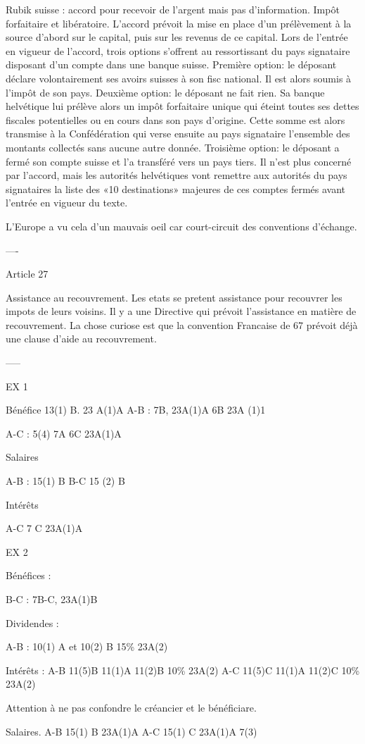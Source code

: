 \documentclass{book}
\begin{document}
Rubik suisse : accord pour recevoir de l'argent mais pas d'information. Impôt forfaitaire et libératoire. L'accord prévoit la mise en place d'un prélèvement à la source d'abord sur le capital, puis sur les revenus de ce capital. Lors de l'entrée en vigueur de l'accord, trois options s'offrent au ressortissant du pays signataire disposant d'un compte dans une banque suisse. Première option: le déposant déclare volontairement ses avoirs suisses à son fisc national. Il est alors soumis à l'impôt de son pays. Deuxième option: le déposant ne fait rien. Sa banque helvétique lui prélève alors un impôt forfaitaire unique qui éteint toutes ses dettes fiscales potentielles ou en cours dans son pays d'origine. Cette somme est alors transmise à la Confédération qui verse ensuite au pays signataire l'ensemble des montants collectés sans aucune autre donnée. Troisième option: le déposant a fermé son compte suisse et l'a transféré vers un pays tiers. Il n'est plus concerné par l'accord, mais les autorités helvétiques vont remettre aux autorités du pays signataires la liste des «10 destinations» majeures de ces comptes fermés avant l'entrée en vigueur du texte.

L'Europe a vu cela d'un mauvais oeil car court-circuit des conventions d'échange.

----

Article 27

Assistance au recouvrement. Les etats se pretent assistance pour recouvrer les impots de leurs voisins. Il y a une Directive qui prévoit l'assistance en matière de recouvrement. La chose curiose est que la convention Francaise de 67 prévoit déjà une clause d'aide au recouvrement.

-----

EX 1


Bénéfice 13(1) B. 23 A(1)A
A-B : 7B, 23A(1)A
6B 23A (1)1

A-C : 5(4) 7A
6C 23A(1)A

Salaires

A-B : 15(1) B
B-C 15 (2) B

Intérêts 

A-C 7 C 23A(1)A


EX 2

Bénéfices :

B-C : 7B-C, 23A(1)B

Dividendes :

A-B : 10(1) A et 10(2) B 15\% 23A(2)

Intérêts : 
A-B 11(5)B 11(1)A 11(2)B 10\% 23A(2)
A-C 11(5)C 11(1)A 11(2)C 10\% 23A(2)

Attention à ne pas confondre le créancier et le bénéficiare.

Salaires.
A-B 15(1) B 23A(1)A
A-C 15(1) C 23A(1)A 7(3)

\nocite{*}

\end{document}
